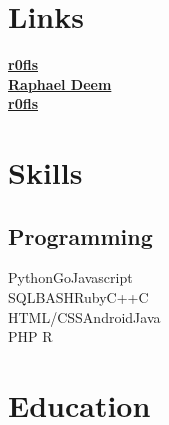 \documentclass[]{deemweaver}
\begin{document}
%
%
\lastupdated

%
%


%
%

\begin{minipage}[t]{0.33\textwidth}


\section{Links}
{\FA \faGithub} \href{https://github.com/r0fls}{\bf r0fls} \\
{\FA \faLinkedin} \href{https://www.linkedin.com/in/raphael-deem-5757ba31}{\bf Raphael Deem} \\
{\FA \faStackOverflow}  \href{http://stackoverflow.com/users/1318734/rofls}{\bf r0fls} \\


\section{Skills}
\subsection{Programming}
Python\textbullet{}Go\textbullet{}Javascript\\
SQL\textbullet{}BASH\textbullet{}Ruby\textbullet{}C++\textbullet{}C\\
HTML/CSS\textbullet{}Android\textbullet{}Java\\
PHP \textbullet{}R\\
\sectionsep



\section{Education}


\end{minipage}
\end{document}
